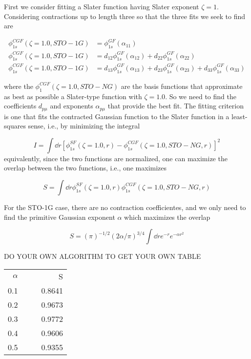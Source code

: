 \documentclass[11pt]{article}
\begin{document}
First we consider fitting a Slater function having Slater exponent \(\zeta = 1\). Considering contractions up to length three so that the three fits we seek to find are

\begin{align*}
    \phi_{1s}^{CGF}(\zeta=1.0, STO-1G) &= \phi_{1s}^{GF}(\alpha_{11}) \\
    \phi_{1s}^{CGF}(\zeta=1.0, STO-1G) &= d_{12}\phi_{1s}^{GF}(\alpha_{12}) + d_{22} \phi_{1s}^{GF}(\alpha_{22}) \\
    \phi_{1s}^{CGF}(\zeta=1.0, STO-1G) &= d_{13}\phi_{1s}^{GF}(\alpha_{13}) + d_{23} \phi_{1s}^{GF}(\alpha_{23}) + d_{33}\phi_{1s}^{GF}(\alpha_{33})
\end{align*}

where the \(\phi_1^{CGF} (\zeta = 1.0,STO-NG)\) are the basis functions that approximate as best as possible a Slater-type function with \(\zeta = 1.0\). So we need to find the coefficients \(d_{p\mu}\) and exponents \(\alpha_{p\mu}\) that provide the best fit. The fitting criterion is one that fits the contracted Gaussian function to the Slater function in a least-squares sense, i.e., by minimizing the integral

\[ I = \int \dd{r}[\phi_{1s}^{SF}(\zeta = 1.0,r) - \phi_{1s}^{CGF}(\zeta = 1.0, STO-NG,r)]^2 \]
equivalently, since the two functions are normalized, one can maximize the overlap between the two functions, i.e., one maximizes

\[ S = \int \dd{r}\phi_{1s}^{SF}(\zeta = 1.0,r) \phi_{1s}^{CGF}(\zeta = 1.0, STO-NG,r) \]

For the STO-1G case, there are no contraction coefficientes, and we only need to find the primitive Gaussian exponent \(\alpha\) which maximizes the overlap

\[ S = (\pi)^{-1/2} (2\alpha/\pi)^{3/4} \int \dd{r}e^{-r}e^{-\alpha r^2} \]


DO YOUR OWN ALGORITHM TO GET YOUR OWN TABLE

\begin{center}
\begin{tabular}{rllr}
\hline
\(\alpha\) &  &  & S\\
0.1 &  &  & 0.8641\\
0.2 &  &  & 0.9673\\
0.3 &  &  & 0.9772\\
0.4 &  &  & 0.9606\\
0.5 &  &  & 0.9355\\
\hline
\end{tabular}
\end{center}
\end{document}
